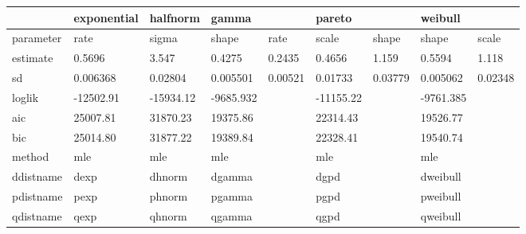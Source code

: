 \begingroup\fontsize{11pt}{12pt}\selectfont
\begin{tabularx}{\textwidth}{L{.4}L{.4}L{.4}L{.3}L{.3}L{.3}L{.3}L{.3}L{.3}}
  \toprule
{\textbf{}} & {\textbf{exponential}} & {\textbf{halfnorm}} & {\textbf{gamma}} & {\textbf{}} & {\textbf{pareto}} & {\textbf{}} & {\textbf{weibull}} & {\textbf{}} \\ 
  \midrule
parameter & rate & sigma & shape & rate & scale & shape & shape & scale \\ 
  estimate & 0.5696 & 3.547 & 0.4275 & 0.2435 & 0.4656 & 1.159 & 0.5594 & 1.118 \\ 
  sd & 0.006368 & 0.02804 & 0.005501 & 0.00521 & 0.01733 & 0.03779 & 0.005062 & 0.02348 \\ 
  loglik & -12502.91 & -15934.12 & -9685.932 &  & -11155.22 &  & -9761.385 &  \\ 
  aic & 25007.81 & 31870.23 & 19375.86 &  & 22314.43 &  & 19526.77 &  \\ 
  bic & 25014.80 & 31877.22 & 19389.84 &  & 22328.41 &  & 19540.74 &  \\ 
  method & mle & mle & mle &  & mle &  & mle &  \\ 
  ddistname & dexp & dhnorm & dgamma &  & dgpd &  & dweibull &  \\ 
  pdistname & pexp & phnorm & pgamma &  & pgpd &  & pweibull &  \\ 
  qdistname & qexp & qhnorm & qgamma &  & qgpd &  & qweibull &  \\ 
   \bottomrule
\end{tabularx}
\endgroup
